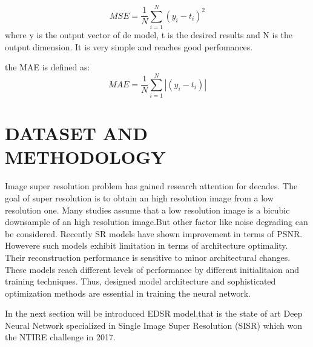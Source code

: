 \documentclass[a4paper, 10pt]{book}
\begin{document}
$$ MSE = \frac{1}{N}\sum\limits_{i=1}^N (y_i - t_i)^2$$
where y is the output vector of de model, t is the desired results and N is the output dimension. It is very simple and reaches good perfomances.

the MAE is defined as:
$$ MAE = \frac{1}{N}\sum\limits_{i=1}^N \left|(y_i - t_i) \right|$$

\chapter{DATASET AND METHODOLOGY} 
Image super resolution  problem has gained research attention for decades.
The goal of super resolution is to obtain an high resolution image from a low resolution one.
Many studies assume that a low resolution image is a bicubic downsample of an high resolution image.But other factor like noise degrading can be considered.
Recently SR models have shown improvement in terms of PSNR. Howevere such models exhibit limitation in terms of architecture optimality.
Their reconstruction performance is sensitive to minor architectural changes. These models reach different levels of performance by different initialitaion and training techniques.
Thus, designed model architecture and  sophisticated optimization methods are essential in training the neural network.

In the next section will be introduced EDSR model,that is the state of art Deep Neural Network specialized in Single Image Super Resolution (SISR) which won the NTIRE challenge in 2017.
\end{document}
